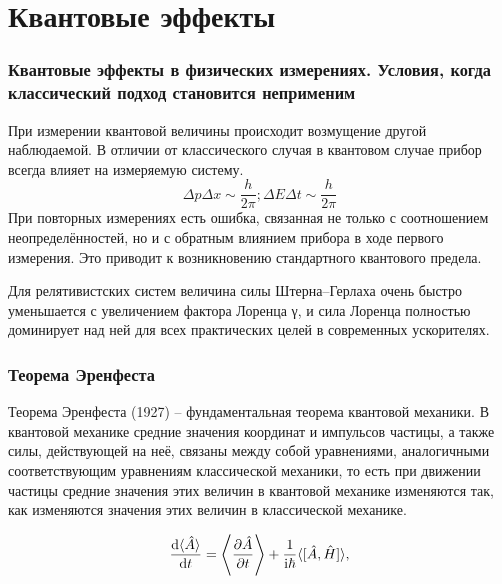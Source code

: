 \section{Квантовые эффекты}

\begin{frame}
	\frametitle{Квантовые эффекты в физических измерениях. Условия, когда классический подход становится неприменим}
	
	При измерении квантовой величины происходит возмущение другой наблюдаемой. В отличии от классического случая в квантовом случае прибор всегда влияет на измеряемую систему.
	\begin{equation}
	\Delta p \Delta x \sim \frac{h}{2 \pi}; \Delta E \Delta t \sim \frac{h}{2 \pi}
	\end{equation} 
	При повторных измерениях есть ошибка, связанная не только с соотношением неопределённостей, но и с обратным влиянием прибора в ходе первого измерения. Это приводит к возникновению стандартного квантового предела.
	
	Для релятивистских систем величина силы Штерна–Герлаха очень быстро уменьшается с увеличением фактора Лоренца γ, и сила Лоренца полностью доминирует над ней для всех практических целей в современных ускорителях.
	
\end{frame}

\begin{frame}
	\frametitle{Теорема Эренфеста}
	 \par Теорема Эренфеста (1927) – фундаментальная теорема квантовой механики. В квантовой механике средние значения координат и импульсов частицы, а также силы, действующей на неё, связаны между собой уравнениями, аналогичными соответствующим уравнениям классической механики, то есть при движении частицы средние значения этих величин в квантовой механике изменяются так, как изменяются значения этих величин в классической механике.
	 
	 \begin{equation}
	 	\dv{\langle\hat{A}\rangle}{t}=\left\langle\frac{\partial \hat{A}}{\partial t}\right\rangle+\frac{1}{\mathrm{i} \hbar}\langle[\hat{A}, \hat{H}]\rangle,
	 	\label{eq:erenfest}
	 \end{equation} 
\end{frame}

